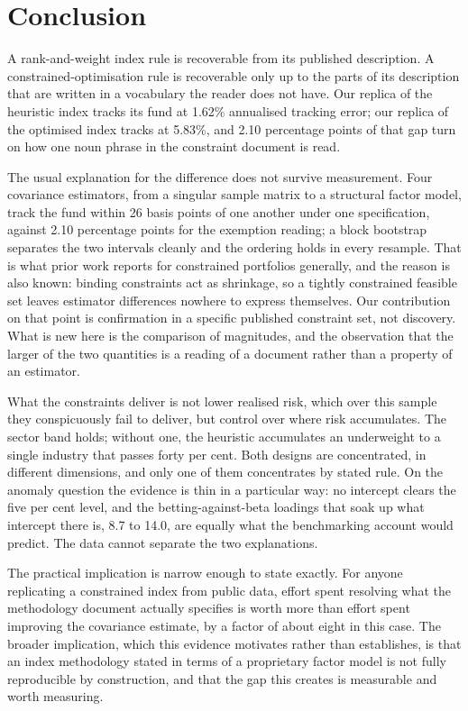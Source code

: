 \section{Conclusion}
\label{sec:conclusion}
A rank-and-weight index rule is recoverable from its published description. A
constrained-optimisation rule is recoverable only up to the parts of its
description that are written in a vocabulary the reader does not have. Our
replica of the heuristic index tracks its fund at 1.62\% annualised tracking
error; our replica of the optimised index tracks at 5.83\%, and 2.10 percentage
points of that gap turn on how one noun phrase in the constraint document is
read.

The usual explanation for the difference does not survive measurement. Four
covariance estimators, from a singular sample matrix to a structural factor
model, track the fund within 26 basis points of one another under one
specification, against 2.10 percentage points for the exemption reading; a
block bootstrap separates the two intervals cleanly and the ordering holds in
every resample. That is what prior work reports for constrained portfolios
generally, and the reason is also known: binding constraints act as shrinkage,
so a tightly constrained feasible set leaves estimator differences nowhere to
express themselves. Our contribution on that point is confirmation in a
specific published constraint set, not discovery. What is new here is the
comparison of magnitudes, and the observation that the larger of the two
quantities is a reading of a document rather than a property of an estimator.

What the constraints deliver is not lower realised risk, which over this sample
they conspicuously fail to deliver, but control over where risk accumulates.
The sector band holds; without one, the heuristic accumulates an underweight to
a single industry that passes forty per cent. Both designs are concentrated, in
different dimensions, and only one of them concentrates by stated rule. On the
anomaly question the evidence is thin in a particular way: no intercept clears
the five per cent level, and the betting-against-beta loadings that soak up
what intercept there is, 8.7 to 14.0, are equally what the benchmarking account
would predict. The data cannot separate the two explanations.

The practical implication is narrow enough to state exactly. For anyone
replicating a constrained index from public data, effort spent resolving what
the methodology document actually specifies is worth more than effort spent
improving the covariance estimate, by a factor of about eight in this case. The broader implication, which this evidence motivates rather than
establishes, is that an index methodology stated in terms of a proprietary
factor model is not fully reproducible by construction, and that the gap this
creates is measurable and worth measuring.
